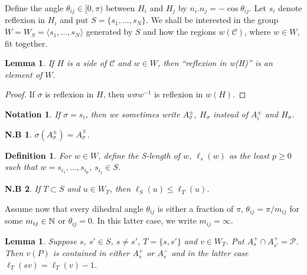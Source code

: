 \documentclass{notes}
\theoremstyle{plain}
\newtheorem{definition}[proposition]{Definition}
\newtheorem{lemma}[proposition]{Lemma}
\newtheorem*{notes}{N.B}
\newtheorem*{notation}{Notation}
\newcommand{\cC}{\mathcal{C}}
\newcommand{\cP}{\mathcal{P}}
\begin{document}
Define the angle $\theta_{ij} \in [0,\pi)$ between $H_i$ and $H_j$ by
$n_i.n_j = - \cos \theta_{ij}$.  Let $s_i$ denote reflexion in $H_i$ and put
$S = \{ s_1, \dots, s_N\}$.  We shall be interested in the group
$W = W_S = \langle s_1, \dots, s_N \rangle$ generated by $S$ and how the
regions $w(\cC)$, where $w \in W$, fit together.

\begin{lemma}
If $H$ is a side of $\cC$ and $w \in W$, then ``reflexion in w(H)'' is an
element of $W$.
\end{lemma}

\begin{proof}
If $\sigma$ is reflexion in $H$, then $w \sigma w^{-1}$ is reflexion in
$w(H)$. 
\end{proof}

\begin{notation}
If $\sigma = s_i$, then we sometimes write $A_\sigma^\pm$, $H_\sigma$ instead
of $A_i^\pm$ and $H_\sigma$.
\end{notation}

\begin{notes}
$\sigma(A_\sigma^\pm) = A_\sigma^\mp$.
\end{notes}

\begin{definition}
For $w \in W$, define the \emph{S-length} of $w$, $\ell_s(w)$ as the least
$p \ge 0$ such that $w = s_{i_1}, \dots, s_{i_p}$, $s_{i_j} \in S$.
\end{definition}

\begin{notes}
If $T \subset S$ and $u \in W_T$, then $\ell_S(u) \le \ell_T(u)$.
\end{notes}

Assume now that every dihedral angle $\theta_{ij}$ is either a fraction of
$\pi$, $\theta_{ij} = \pi/m_{ij}$ for some $m_{ij} \in \mathbb{N}$ or $\theta_{ij}=0$.
In this latter case, we write $m_{ij} = \infty$.

\begin{lemma}
Suppose $s$, $s' \in S$, $s \neq s'$, $T = \{s,s'\}$ and $v \in W_T$.  Put
$A_s^+ \cap A_{s'}^+ = \cP$.  Then $v(P)$ is contained in either $A_s^+$ or
$A_s^-$ and in the latter case $\ell_T(sv) = \ell_T(v) - 1$. 
\end{lemma}
\end{document}
